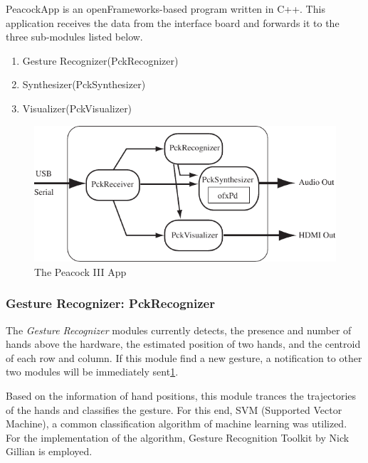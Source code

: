 \documentclass{nime-alternate}
\begin{document}
PeacockApp is an openFrameworks\cite{openframeworks}-based program written in C++. This application receives the data from the interface board and forwards it to the three sub-modules listed below. 

\begin{enumerate}
       \item Gesture Recognizer(PckRecognizer)
       \item Synthesizer(PckSynthesizer)
       \item Visualizer(PckVisualizer)
\end{enumerate}


\begin{figure}[htbp]
       \begin{center}
              \includegraphics[width=1\columnwidth]{Peacock_app.pdf}
       \end{center}
       \caption{The Peacock III App}
       \label{fig:modules}
\end{figure}

\subsubsection{Gesture Recognizer: PckRecognizer}

The {\it Gesture Recognizer} modules currently detects, the presence and number of hands above the hardware, the estimated position of two hands, and the centroid of each row and column.  If this module find a new gesture, a notification to other two modules will be immediately sent\ref{fig:modules}.

Based on the information of hand positions, this module trances the trajectories of the hands and classifies the gesture. For this end,  SVM (Supported Vector Machine), a common classification algorithm of machine learning was utilized. For the implementation of the algorithm, Gesture Recognition Toolkit \cite{gillian:grt} by Nick Gillian is employed.
\end{document}
